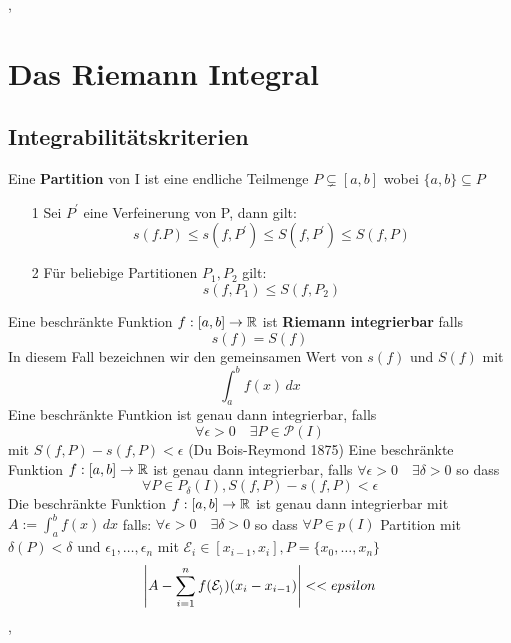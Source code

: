 \sep
\section{Das Riemann Integral}
\subsection{Integrabilitätskriterien}
 Eine \textbf{Partition} von I ist eine endliche Teilmenge \(P \subsetneq[a, b]\) wobei \(\{a,b\} \subseteq P\)
\begin{enumerate}
    \item [1] Sei \(P^{'}\) eine Verfeinerung von P, dann gilt:
    \[s(f.P) \leq s(f,P^{'}) \leq S(f, P^{'}) \leq S(f,P)\]
    \item [2] Für beliebige Partitionen \(P_1, P_2\) gilt:
    \[s(f,P_1) \leq S(f, P_2)\]
\end{enumerate}
 Eine beschränkte Funktion \(f: [a,b] \rightarrow \mathbb{R} \) ist \textbf{Riemann integrierbar} falls
\[s(f) = S(f)\]
In diesem Fall bezeichnen wir den gemeinsamen Wert von \(s(f)\) und \(S(f)\) mit
\[ \int_{a}^{b} f(x) \,dx \]
 Eine beschränkte Funtkion ist genau dann integrierbar, falls
\[ \forall \epsilon > 0 \quad \exists P \in \mathcal{P}(I)\] mit \(S(f,P) - s(f,P) < \epsilon\)
(Du Bois-Reymond 1875)
Eine beschränkte Funktion \(f : [a,b] \rightarrow \mathbb{R} \) ist genau dann integrierbar, falls \( \forall \epsilon > 0 \quad \exists \delta > 0\) so dass
\[ \forall P \in P_{\delta}(I), S(f, P) - s(f, P ) < \epsilon \]
 Die beschränkte Funktion \(f: [a,b] \rightarrow \mathbb{R} \) ist genau dann integrierbar mit \(A:= \int_{a}^{b} f(x) \,dx\) falls:
\( \forall \epsilon > 0 \quad \exists \delta > 0 \) so dass \( \forall P \in p(I) \) Partition mit \( \delta(P) < \delta \) und \( \epsilon_1, \dots, \epsilon_n\) mit
\(\mathcal{E}_i \in [x_{i-1}, x_i], P= \{x_0, \dots, x_n\}\)
\[\left\lvert  A - \sum_{i=1}^n f(\mathcal{E_i}) ( x_i - x_{i-1})  \right\rvert < <epsilon \]
\sep
